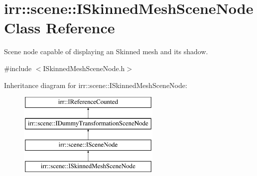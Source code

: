\hypertarget{classirr_1_1scene_1_1ISkinnedMeshSceneNode}{}\section{irr\+:\+:scene\+:\+:I\+Skinned\+Mesh\+Scene\+Node Class Reference}
\label{classirr_1_1scene_1_1ISkinnedMeshSceneNode}


Scene node capable of displaying an Skinned mesh and its shadow.  




{\ttfamily \#include $<$I\+Skinned\+Mesh\+Scene\+Node.\+h$>$}

Inheritance diagram for irr\+:\+:scene\+:\+:I\+Skinned\+Mesh\+Scene\+Node\+:\begin{figure}[H]
\begin{center}
\leavevmode
\includegraphics[height=4.000000cm]{classirr_1_1scene_1_1ISkinnedMeshSceneNode}
\end{center}
\end{figure}
